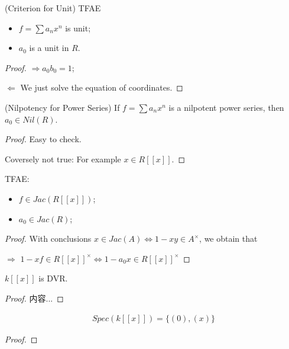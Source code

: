 \documentclass[Total.tex]{subfiles}
\begin{document}
			\begin{proposition}
				(Criterion for Unit) TFAE
				\begin{itemize}
					\item $f=\sum a_n x^n$ is unit;
					\item $a_0$ is a unit in $R$. 
				\end{itemize}
			\end{proposition}
			\begin{proof}
				$\Rightarrow a_0b_0=1$;
				
				$\Leftarrow$ We just solve the equation of coordinates. 
			\end{proof}
			
			\begin{proposition}
				(Nilpotency for Power Series) If $f=\sum a_n x^n$ is a nilpotent power series, then $a_0\in Nil(R)$. 
			\end{proposition}
			\begin{proof}
				Easy to check. 
				
				Coversely not true: For example $x\in R[[x]]$. 
			\end{proof}
			
			\begin{proposition}
				TFAE:
				\begin{itemize}
					\item $f\in Jac(R[[x]])$;
					\item $a_0\in Jac(R)$;
				\end{itemize}
			\end{proposition}
			\begin{proof}
				With conclusions $x\in Jac(A)\Leftrightarrow 1-xy\in A^\times$, we obtain that
				
				$\Rightarrow$ $1-xf\in R[[x]]^\times\Leftrightarrow       1-a_0x\in R[[x]]^\times$
			\end{proof}
			
			\begin{lemma}
				$k[[x]]$ is DVR.
			\end{lemma}
			\begin{proof}
				内容...
			\end{proof}
			
			\begin{proposition}
				\begin{gather*}
					Spec(k[[x]])=\{(0),(x)\}
				\end{gather*}
			\end{proposition}
			\begin{proof}
				
			\end{proof}
			
\end{document}
